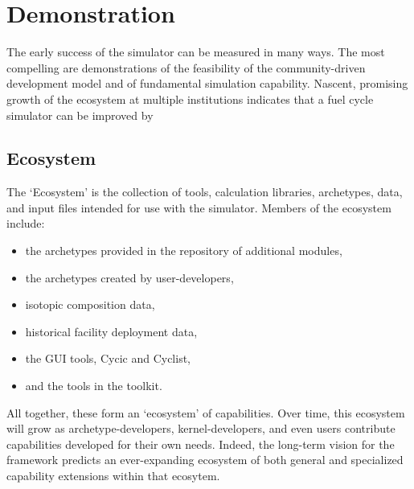 \section{Demonstration}
%

%


The early success of the \Cyclus simulator can be measured in many ways. 
The most compelling are demonstrations of the feasibility of the \Cyclus community-driven development 
model and of fundamental simulation capability. Nascent, promising growth of the \Cyclus 
ecosystem at multiple institutions indicates that a fuel cycle simulator can be 
improved by 

\subsection{Ecosystem}

The \Cyclus `Ecosystem' is the collection of tools, calculation libraries, 
archetypes, data, and input files intended for use with the \Cyclus simulator. 
Members of the ecosystem include:
\begin{itemize}
\item the archetypes provided in the \Cycamore \cite{carlsen_cycamore_2014} 
repository of additional modules,
\item the archetypes created by user-developers,
\item isotopic composition data,
\item historical facility deployment data,
\item the \Cyclus \gls{GUI} tools, Cycic and Cyclist,
\item and the tools in the \Cyclus toolkit.
\end{itemize}
All together, these form an `ecosystem' of capabilities. Over time, this 
ecosystem will grow as archetype-developers, kernel-developers, and 
even users contribute capabilities developed for their own needs. Indeed, the 
long-term vision for the \Cyclus framework predicts an ever-expanding ecosystem 
of both general and specialized capability extensions within that ecosytem. 

